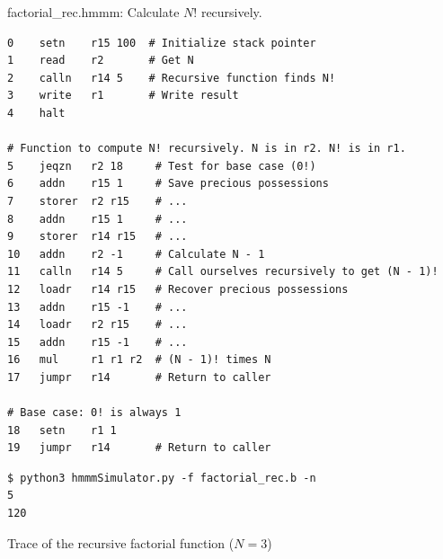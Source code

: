\documentclass[8pt,a4paper,compress]{beamer}
\begin{document}
\begin{frame}[fragile]
\pause

\begin{framed}
\tiny factorial\_rec.hmmm: Calculate $N!$ recursively.
\end{framed}

\begin{lstlisting}[language={}]
0    setn    r15 100  # Initialize stack pointer
1    read    r2       # Get N
2    calln   r14 5    # Recursive function finds N!
3    write   r1       # Write result
4    halt

# Function to compute N! recursively. N is in r2. N! is in r1. 
5    jeqzn   r2 18     # Test for base case (0!)
6    addn    r15 1     # Save precious possessions
7    storer  r2 r15    # ...
8    addn    r15 1     # ...
9    storer  r14 r15   # ...
10   addn    r2 -1     # Calculate N - 1
11   calln   r14 5     # Call ourselves recursively to get (N - 1)!
12   loadr   r14 r15   # Recover precious possessions
13   addn    r15 -1    # ...
14   loadr   r2 r15    # ...
15   addn    r15 -1    # ...
16   mul     r1 r1 r2  # (N - 1)! times N
17   jumpr   r14       # Return to caller

# Base case: 0! is always 1
18   setn    r1 1
19   jumpr   r14       # Return to caller
\end{lstlisting}

\pause

\begin{lstlisting}[language={}]
$ python3 hmmmSimulator.py -f factorial_rec.b -n
5
120
\end{lstlisting}
\end{frame}

\begin{frame}[fragile]
\pause

Trace of the recursive factorial function ($N=3$)
\begin{center}
\end{center}
\end{frame}
\end{document}

